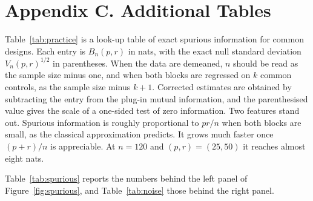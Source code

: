 \section*{Appendix C. Additional Tables}

Table~\ref{tab:practice} is a look-up table of exact spurious information for common designs. Each entry is $B_n(p,r)$ in nats, with the exact null standard deviation $V_n(p,r)^{1/2}$ in parentheses. When the data are demeaned, $n$ should be read as the sample size minus one, and when both blocks are regressed on $k$ common controls, as the sample size minus $k+1$. Corrected estimates are obtained by subtracting the entry from the plug-in mutual information, and the parenthesised value gives the scale of a one-sided test of zero information. Two features stand out. Spurious information is roughly proportional to $pr/n$ when both blocks are small, as the classical approximation predicts. It grows much faster once $(p+r)/n$ is appreciable. At $n=120$ and $(p,r)=(25,50)$ it reaches almost eight nats.

\begin{table}[htbp]
\centering
\caption{Exact spurious information $B_n(p,r)$ in nats, with null standard deviation $V_n(p,r)^{1/2}$ in parentheses, for block dimensions $(p,r)$ and degrees of freedom $n$. A dash indicates $n<p+r+2$.}
\label{tab:practice}
\footnotesize
\setlength{\tabcolsep}{4pt}

\end{table}

Table~\ref{tab:spurious} reports the numbers behind the left panel of Figure~\ref{fig:spurious}, and Table~\ref{tab:noise} those behind the right panel.

\begin{table}[htbp]
\centering
\caption{Null mean and standard deviation of the plug-in mutual information for independent blocks with $p=r$ at $n=250$: exact digamma values, proportional limit, classical approximation and simulation (\MCRepsQuarter{} draws per row).}
\label{tab:spurious}
\small

\end{table}

\begin{table}[htbp]
\centering
\caption{Mutual information estimates with $m$ appended uninformative signals ($n=250$, five payoffs, five informative signals with canonical correlation $0.4$), averaged over \MCRepsQuarter{} draws. ``Predicted'' is $I+B_n(5,5+m)$.}
\label{tab:noise}
\small

\end{table}
